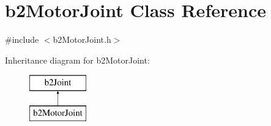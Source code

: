 \hypertarget{classb2MotorJoint}{}\section{b2\+Motor\+Joint Class Reference}
\label{classb2MotorJoint}


{\ttfamily \#include $<$b2\+Motor\+Joint.\+h$>$}

Inheritance diagram for b2\+Motor\+Joint\+:\begin{figure}[H]
\begin{center}
\leavevmode
\includegraphics[height=2.000000cm]{classb2MotorJoint}
\end{center}
\end{figure}
